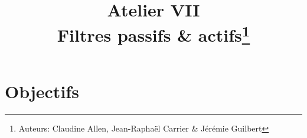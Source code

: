 \documentclass[canadien,12pt,oneside,letterpaper]{article}
\title{\textbf{Atelier VII}\\Filtres passifs \& actifs\thanks{Auteurs: Claudine Allen, Jean-Raphaël Carrier \& Jérémie Guilbert}}
\date{}
\begin{document}
\maketitle \vspace{-2cm}

\section{Objectifs}

%
%
%
%
\end{document}

